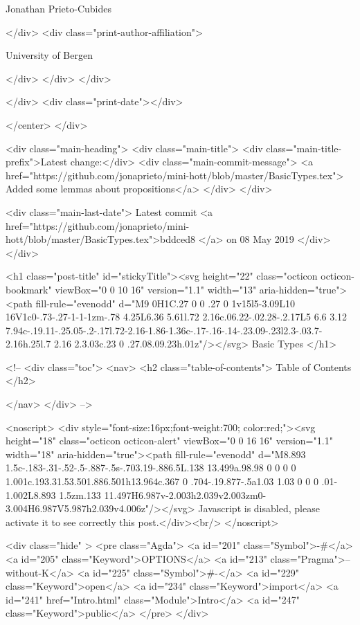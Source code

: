                   Jonathan Prieto-Cubides
                
              </div>
              <div class="print-author-affiliation">
                
                  University of Bergen
                
                </div>
            </div>
          </div>
          
          
        </div>
        <div class="print-date"></div>
        
        
    </center>
  </div>

  
  <div class="main-heading">
    <div class="main-title">
      <div class="main-title-prefix">Latest change:</div>
      <div class="main-commit-message">
            <a href="https://github.com/jonaprieto/mini-hott/blob/master/BasicTypes.tex">
              Added some lemmas about propositions</a>
      </div>
    </div>

    <div class="main-last-date">
      Latest commit <a href="https://github.com/jonaprieto/mini-hott/blob/master/BasicTypes.tex">bddced8 </a> on  08 May 2019
    </div>
  </div>
  
  <h1 class="post-title" id="stickyTitle"><svg height="22" class="octicon octicon-bookmark" viewBox="0 0 10 16" version="1.1" width="13" aria-hidden="true"><path fill-rule="evenodd" d="M9 0H1C.27 0 0 .27 0 1v15l5-3.09L10 16V1c0-.73-.27-1-1-1zm-.78 4.25L6.36 5.61l.72 2.16c.06.22-.02.28-.2.17L5 6.6 3.12 7.94c-.19.11-.25.05-.2-.17l.72-2.16-1.86-1.36c-.17-.16-.14-.23.09-.23l2.3-.03.7-2.16h.25l.7 2.16 2.3.03c.23 0 .27.08.09.23h.01z"/></svg> Basic Types
  </h1>

  <!-- 
  <div class="toc">
    <nav>
    <h2 class="table-of-contents"> Table of Contents </h2>
      

    </nav>
  </div>
   -->

  <noscript>
  <div style="font-size:16px;font-weight:700; color:red;"><svg height="18" class="octicon octicon-alert" viewBox="0 0 16 16" version="1.1" width="18" aria-hidden="true"><path fill-rule="evenodd" d="M8.893 1.5c-.183-.31-.52-.5-.887-.5s-.703.19-.886.5L.138 13.499a.98.98 0 0 0 0 1.001c.193.31.53.501.886.501h13.964c.367 0 .704-.19.877-.5a1.03 1.03 0 0 0 .01-1.002L8.893 1.5zm.133 11.497H6.987v-2.003h2.039v2.003zm0-3.004H6.987V5.987h2.039v4.006z"/></svg> Javascript is disabled, please activate it to see correctly this post.</div><br/>
  </noscript>

  <div class="hide" >
<pre class="Agda">
<a id="201" class="Symbol">{-#</a> <a id="205" class="Keyword">OPTIONS</a> <a id="213" class="Pragma">--without-K</a> <a id="225" class="Symbol">#-}</a>
<a id="229" class="Keyword">open</a> <a id="234" class="Keyword">import</a> <a id="241" href="Intro.html" class="Module">Intro</a> <a id="247" class="Keyword">public</a>
</pre>
</div>

